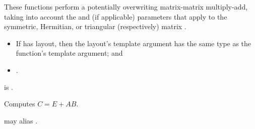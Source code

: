 \begin{itemdescr}
\pnum
These functions perform
a potentially overwriting matrix-matrix multiply-add,
taking into account the  and  (if applicable) parameters
that apply to the symmetric, Hermitian, or triangular (respectively) matrix .

\pnum
\mandates
\begin{itemize}
\item
If  has  layout, then the
      layout's  template argument has the same type as
      the function's  template argument; and
\item
{}.
\end{itemize}

\pnum
\expects
{} is .

\pnum
\effects
Computes $C = E + A B$.

\pnum
\remarks
{} may alias .
\end{itemdescr}


